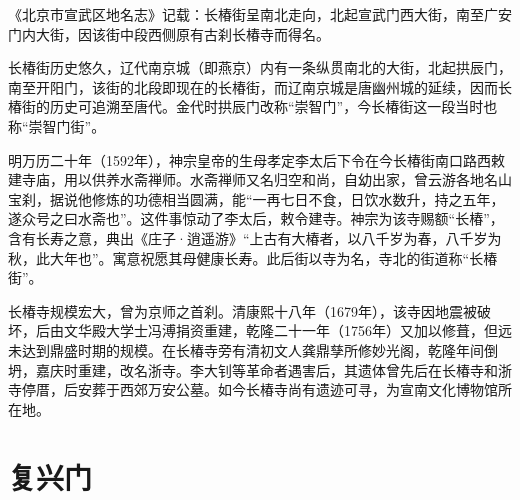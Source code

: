 《北京市宣武区地名志》记载：长椿街呈南北走向，北起宣武门西大街，南至广安门内大街，因该街中段西侧原有古刹长椿寺而得名。

长椿街历史悠久，辽代南京城（即燕京）内有一条纵贯南北的大街，北起拱辰门，南至开阳门，该街的北段即现在的长椿街，而辽南京城是唐幽州城的延续，因而长椿街的历史可追溯至唐代。金代时拱辰门改称“崇智门”，今长椿街这一段当时也称“崇智门街”。

明万历二十年（1592年），神宗皇帝的生母孝定李太后下令在今长椿街南口路西敕建寺庙，用以供养水斋禅师。水斋禅师又名归空和尚，自幼出家，曾云游各地名山宝刹，据说他修炼的功德相当圆满，能“一再七日不食，日饮水数升，持之五年，遂众号之曰水斋也”。这件事惊动了李太后，敕令建寺。神宗为该寺赐额“长椿”，含有长寿之意，典出《庄子·逍遥游》“上古有大椿者，以八千岁为春，八千岁为秋，此大年也”。寓意祝愿其母健康长寿。此后街以寺为名，寺北的街道称“长椿街”。

长椿寺规模宏大，曾为京师之首刹。清康熙十八年（1679年），该寺因地震被破坏，后由文华殿大学士冯溥捐资重建，乾隆二十一年（1756年）又加以修葺，但远未达到鼎盛时期的规模。在长椿寺旁有清初文人龚鼎孳所修妙光阁，乾隆年间倒坍，嘉庆时重建，改名浙寺。李大钊等革命者遇害后，其遗体曾先后在长椿寺和浙寺停厝，后安葬于西郊万安公墓。如今长椿寺尚有遗迹可寻，为宣南文化博物馆所在地。

\section{复兴门}